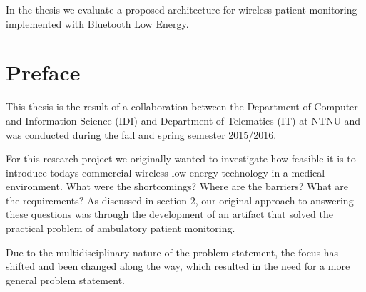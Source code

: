 \begin{preface}
In the thesis we evaluate a proposed architecture for wireless patient monitoring implemented with Bluetooth Low Energy.

\section{Preface}
This thesis is the result of a collaboration between the Department of Computer and Information Science (IDI) and Department of Telematics (IT) at NTNU and was conducted during the fall and spring semester 2015/2016.

For this research project we originally wanted to investigate how feasible it is to introduce todays commercial wireless low-energy technology in a medical environment. What were the shortcomings? Where are the barriers? What are the requirements? As discussed in section 2, our original approach to answering these questions was through the development of an artifact that solved the practical problem of ambulatory patient monitoring.

Due to the multidisciplinary nature of the problem statement, the focus has shifted and been changed along the way, which resulted in the need for a more general problem statement.

\end{preface}